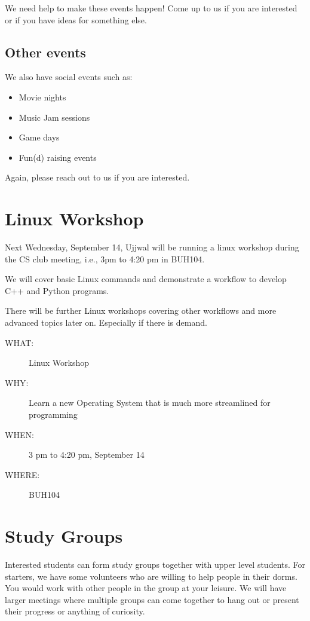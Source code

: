 We need help to make these events happen! Come up to us if you are interested
or if you have ideas for something else.

\newpage

\subsection{Other events}
\label{sec:orgheadline9}

We also have social events such as:
\begin{itemize}
\item Movie nights
\item Music Jam sessions
\item Game days
\item Fun(d) raising events
\end{itemize}

Again, please reach out to us if you are interested.

\newpage


\section{Linux Workshop}
\label{sec:orgheadline11}

Next Wednesday, September 14, Ujjwal will be running a linux workshop during
the CS club meeting, i.e., 3pm to 4:20 pm in BUH104.

We will cover basic Linux commands and demonstrate a workflow to develop C++
and Python programs.

There will be further Linux workshops covering other workflows and more advanced
topics later on. Especially if there is demand.

\begin{description}
\item[{WHAT:}] Linux Workshop
\item[{WHY:}] Learn a new Operating System that is much more streamlined for programming
\item[{WHEN:}] 3 pm to 4:20 pm, September 14
\item[{WHERE:}] BUH104
\end{description}


\newpage


\section{Study Groups}
\label{sec:orgheadline12}

Interested students can form study groups together with upper level
students. For starters, we have some volunteers who are willing to help people
in their dorms. You would work with other people in the group at your
leisure. We will have larger meetings where multiple groups can come together
to hang out or present their progress or anything of curiosity.

